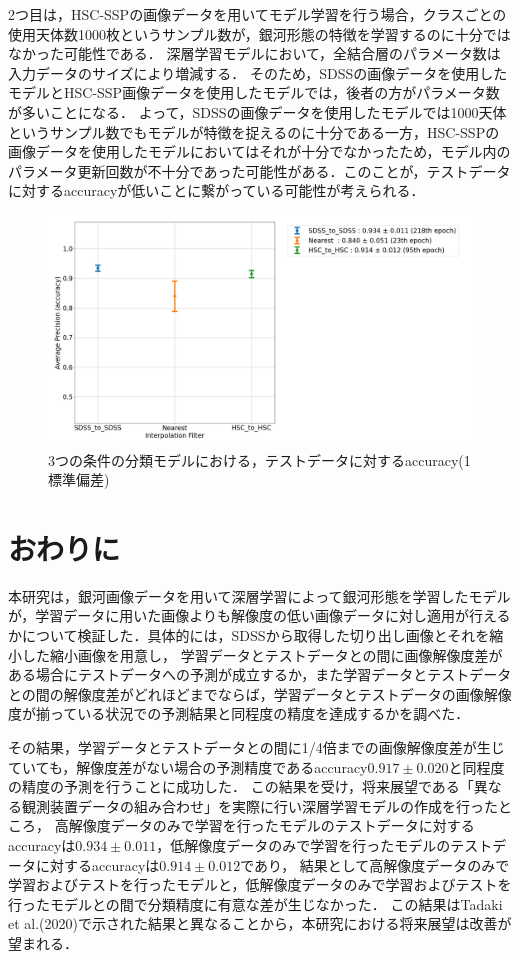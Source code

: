 \documentclass[a4j, 11pt]{jreport}
\begin{document}
2つ目は，HSC-SSPの画像データを用いてモデル学習を行う場合，クラスごとの使用天体数1000枚というサンプル数が，銀河形態の特徴を学習するのに十分ではなかった可能性である．
深層学習モデルにおいて，全結合層のパラメータ数は入力データのサイズにより増減する．
そのため，SDSSの画像データを使用したモデルとHSC-SSP画像データを使用したモデルでは，後者の方がパラメータ数が多いことになる．
よって，SDSSの画像データを使用したモデルでは1000天体というサンプル数でもモデルが特徴を捉えるのに十分である一方，HSC-SSPの画像データを使用したモデルにおいてはそれが十分でなかったため，モデル内のパラメータ更新回数が不十分であった可能性がある．このことが，テストデータに対するaccuracyが低いことに繋がっている可能性が考えられる．

\begin{figure}[H]
  \centering
  \includegraphics[width=1.0\hsize, keepaspectratio]{images/6syou/acc_with_errorbar_auto_epoch.png}
  \caption{3つの条件の分類モデルにおける，テストデータに対するaccuracy(1標準偏差)}
  \label{fig:6syou_zikkenn}
\end{figure}


\newpage
\chapter{おわりに}
本研究は，銀河画像データを用いて深層学習によって銀河形態を学習したモデルが，学習データに用いた画像よりも解像度の低い画像データに対し適用が行えるかについて検証した．具体的には，SDSSから取得した切り出し画像とそれを縮小した縮小画像を用意し，
学習データとテストデータとの間に画像解像度差がある場合にテストデータへの予測が成立するか，また学習データとテストデータとの間の解像度差がどれほどまでならば，学習データとテストデータの画像解像度が揃っている状況での予測結果と同程度の精度を達成するかを調べた．


その結果，学習データとテストデータとの間に1/4倍までの画像解像度差が生じていても，解像度差がない場合の予測精度であるaccuracy$0.917 \pm 0.020$と同程度の精度の予測を行うことに成功した．
この結果を受け，将来展望である「異なる観測装置データの組み合わせ」を実際に行い深層学習モデルの作成を行ったところ，
高解像度データのみで学習を行ったモデルのテストデータに対するaccuracyは$0.934 \pm 0.011$，低解像度データのみで学習を行ったモデルのテストデータに対するaccuracyは$0.914 \pm 0.012$であり，
結果として高解像度データのみで学習およびテストを行ったモデルと，低解像度データのみで学習およびテストを行ったモデルとの間で分類精度に有意な差が生じなかった．
この結果はTadaki et al.(2020)で示された結果と異なることから，本研究における将来展望は改善が望まれる．
\end{document}
